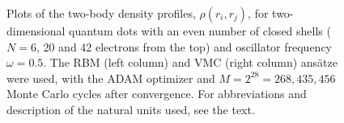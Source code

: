\begin{figure}[H]
	\hspace{0.1cm}
	
	\caption{Plots of the two-body density profiles, $\rho(r_i, r_j)$, for two-dimensional quantum dots with an even number of closed shells ($N=6$, 20 and 42 electrons from the top) and oscillator frequency $\omega=0.5$. The RBM (left column) and VMC (right column) ansätze were used, with the ADAM optimizer and $M=2^{28}=268,435,456$ Monte Carlo cycles after convergence. For  abbreviations and description of the natural units used, see the text.}%
	\label{fig:TB_interaction_20P}
\end{figure}
\noindent

